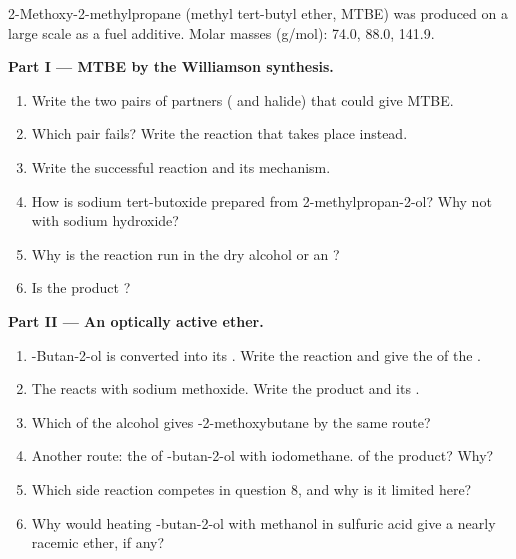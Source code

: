 \begin{problem}
\label{pb:b1:alcohol-activation:1}
2-Methoxy-2-methylpropane (methyl tert-butyl ether, MTBE) was produced on a
large scale as a fuel additive. Molar masses (\unit{g/mol}): 
74.0,  88.0,  141.9.

\medskip
\noindent\textbf{Part I --- MTBE by the Williamson synthesis.}
\begin{enumerate}
  \item Write the two pairs of partners ( and halide) that could
        give MTBE.
  \item Which pair fails? Write the reaction that takes place instead.
  \item Write the successful reaction and its mechanism.
  \item How is sodium tert-butoxide prepared from 2-methylpropan-2-ol?
        Why not with sodium hydroxide?
  \item Why is the reaction run in the dry alcohol or an ?
  \item Is the product ?
\end{enumerate}

\medskip
\noindent\textbf{Part II --- An optically active ether.}
\begin{enumerate}[resume]
  \item {}-Butan-2-ol is converted into its . Write the
        reaction and give the  of the .
  \item The  reacts with sodium methoxide. Write the product and
        its .
  \item Which  of the alcohol gives -2-methoxybutane
        by the same route?
  \item Another route: the  of -butan-2-ol with
        iodomethane.  of the product? Why?
  \item Which side reaction competes in question 8, and why is it
        limited here?
  \item Why would heating -butan-2-ol with methanol in sulfuric
        acid give a nearly racemic ether, if any?
\end{enumerate}


\end{problem}
